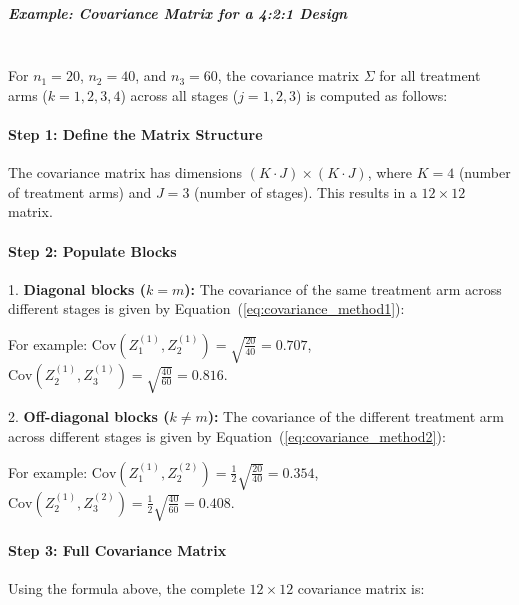 \documentclass[11pt, a4paper]{article}\usepackage[]{graphicx}\usepackage[]{xcolor}
\begin{document}
\nointend\subparagraph{Example: Covariance Matrix for a 4:2:1 Design}\\
For \( n_1 = 20 \), \( n_2 = 40 \), and \( n_3 = 60 \), the covariance matrix \( \Sigma \) for all treatment arms (\( k = 1, 2, 3, 4 \)) across all stages (\( j = 1, 2, 3 \)) is computed as follows:

\paragraph{Step 1: Define the Matrix Structure}
The covariance matrix has dimensions \( (K \cdot J) \times (K \cdot J) \), where \( K = 4 \) (number of treatment arms) and \( J = 3 \) (number of stages). This results in a \( 12 \times 12 \) matrix.


\paragraph{Step 2: Populate Blocks}
1. \textbf{Diagonal blocks (\( k = m \)):} The covariance of the same treatment arm across different stages is given by Equation~(\ref{eq:covariance_method1}):

   For example:
   \( \text{Cov}(Z_1^{(1)}, Z_2^{(1)}) = \sqrt{\frac{20}{40}} = 0.707 \),
   \( \text{Cov}(Z_2^{(1)}, Z_3^{(1)}) = \sqrt{\frac{40}{60}} = 0.816 \).

2. \textbf{Off-diagonal blocks (\( k \neq m \)):} The covariance of the different treatment arm across different stages is given by Equation~(\ref{eq:covariance_method2}):

   For example:
   \( \text{Cov}(Z_1^{(1)}, Z_2^{(2)}) = \frac{1}{2} \sqrt{\frac{20}{40}} = 0.354 \),
   \( \text{Cov}(Z_2^{(1)}, Z_3^{(2)}) = \frac{1}{2} \sqrt{\frac{40}{60}} =  0.408\).\\

\paragraph{Step 3: Full Covariance Matrix}
Using the formula above, the complete \( 12 \times 12 \) covariance matrix is:
\end{document}
